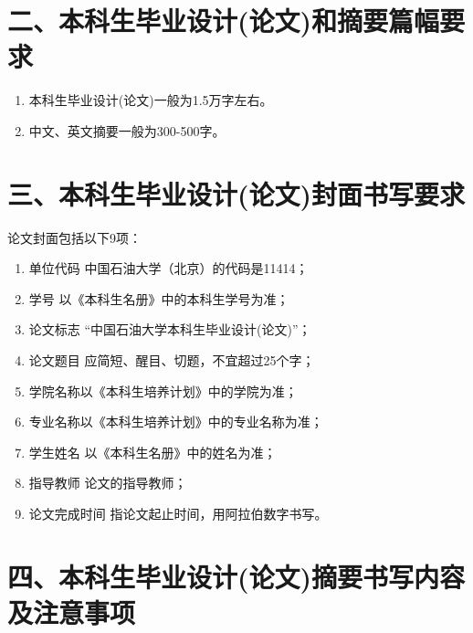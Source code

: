 \documentclass{cupb-thesis}
\begin{document}
\section{二、本科生毕业设计(论文)和摘要篇幅要求}

\begin{enumerate}[label=\arabic*.]
  \item 本科生毕业设计(论文)一般为1.5万字左右。
  \item 中文、英文摘要一般为300-500字。
\end{enumerate}
\section{三、本科生毕业设计(论文)封面书写要求}

论文封面包括以下9项：

\begin{enumerate}[label=（\arabic*）]
  \item 单位代码    中国石油大学（北京）的代码是11414；
  \item 学号        以《本科生名册》中的本科生学号为准；
  \item 论文标志    “中国石油大学本科生毕业设计(论文)”；
  \item 论文题目    应简短、醒目、切题，不宜超过25个字；
  \item 学院名称以《本科生培养计划》中的学院为准；
  \item 专业名称以《本科生培养计划》中的专业名称为准；
  \item 学生姓名    以《本科生名册》中的姓名为准；
  \item 指导教师    论文的指导教师；
  \item 论文完成时间    指论文起止时间，用阿拉伯数字书写。
\end{enumerate}
\section{四、本科生毕业设计(论文)摘要书写内容及注意事项}
\end{document}
